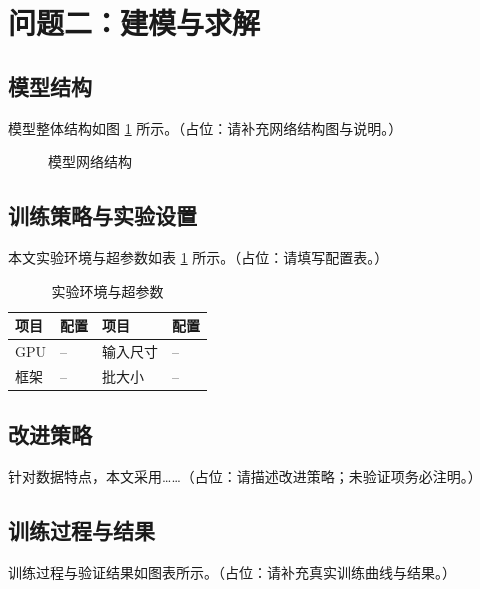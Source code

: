 \section{问题二：建模与求解}

\subsection{模型结构}
模型整体结构如图 \ref{fig:arch} 所示。（占位：请补充网络结构图与说明。）

\begin{figure}[H]
\centering
\caption{模型网络结构}\label{fig:arch}
\end{figure}

\subsection{训练策略与实验设置}
本文实验环境与超参数如表 \ref{tab:setup} 所示。（占位：请填写配置表。）

\begin{table}[H]
\centering
{}
\caption{实验环境与超参数}\label{tab:setup}
\begin{tabular}{llll}
  \toprule
  项目 & 配置 & 项目 & 配置 \\
  \midrule
  GPU & -- & 输入尺寸 & -- \\
  框架 & -- & 批大小 & -- \\
  \bottomrule
\end{tabular}
\end{table}

\subsection{改进策略}
针对数据特点，本文采用……（占位：请描述改进策略；未验证项务必注明。）

\subsection{训练过程与结果}
训练过程与验证结果如图表所示。（占位：请补充真实训练曲线与结果。）
